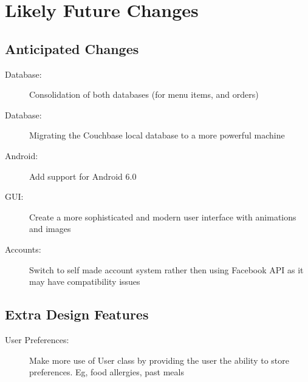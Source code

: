 \documentclass[12pt, titlepage]{article}
\begin{document}
\section{Likely Future Changes}
\subsection{Anticipated Changes}
\begin{description}
  \item[Database:] Consolidation of both databases (for menu items, and orders)
  \item[Database:] Migrating the Couchbase local database to a more powerful machine
  \item[Android:] Add support for Android 6.0
  \item[GUI:] Create a more sophisticated and modern user interface with animations and images
  \item[Accounts:] Switch to self made account system rather then using Facebook API as it may have compatibility issues
 \end{description}
 
\subsection{Extra Design Features}
\begin{description}
  \item[User Preferences:] Make more use of User class by providing the user the ability to store preferences. Eg, food allergies, past meals
\end{description}
\end{document}
